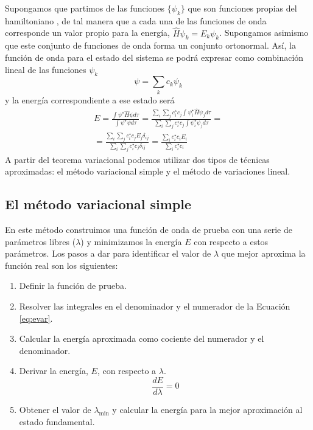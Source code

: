\documentclass{tufte-handout}
\begin{document}
Supongamos que partimos de las funciones $\{\psi_k\}$
que son funciones propias del hamiltoniano , de tal manera que
a cada una de las funciones de onda corresponde un valor propio
para la energía,
$\hat{H}\psi_k=E_k\psi_k$. Supongamos asimismo que este conjunto
de funciones de onda forma un conjunto ortonormal. Así, la función
de onda para el estado del sistema se podrá expresar como
combinación lineal de las funciones $\psi_k$
\begin{equation}
    \psi=\sum_kc_k\psi_k
\end{equation}
y la energía correspondiente a ese estado será
\begin{equation}\begin{split}
    E=\frac{\int{\psi^\star\hat{H}\psi d\tau}}{\int{\psi^\star \psi d\tau}}=  
    \frac{\sum_i\sum_jc_i^\star c_j\int{\psi_i^\star\hat{H}\psi_j d\tau}}{\sum_i\sum_jc_i^\star c_j\int{\psi_i^\star\psi_j d\tau}}= \\
 = \frac{\sum_i\sum_jc_i^\star c_jE_{j}\delta_{ij}}{\sum_i\sum_jc_i^\star c_j\delta_{ij}}=
    \frac{\sum_ic_i^\star c_iE_{i}}{\sum_ic_i^\star c_i}
\end{split}
\end{equation}
A partir del teorema variacional podemos utilizar dos tipos
de técnicas aproximadas: el método variacional simple y el 
método de variaciones lineal.

\subsection{El método variacional simple}
En este método construimos una función de onda de prueba con 
una serie de parámetros libres ($\lambda$) y minimizamos la
energía $E$ con respecto a estos parámetros. Los pasos a dar
para identificar el valor de $\lambda$ que mejor aproxima
la función real son los siguientes:
\begin{enumerate}
    \item Definir la función de prueba.
    \item Resolver las integrales en el denominador y el numerador de la Ecuación \ref{eq:evar}.
    \item Calcular la energía aproximada como cociente del
    numerador y el denominador.
    \item Derivar la energía, $E$, con respecto a $\lambda$.
    \begin{equation}
        \frac{dE}{d\lambda} = 0  
    \end{equation}
    \item Obtener el valor de $\lambda_\mathrm{min}$ y calcular la energía para la mejor aproximación al
    estado fundamental.
\end{enumerate}
\end{document}
